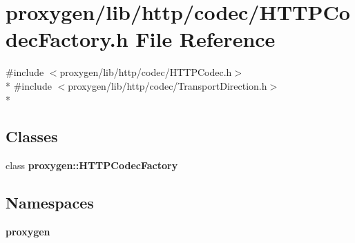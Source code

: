 \section{proxygen/lib/http/codec/\+H\+T\+T\+P\+Codec\+Factory.h File Reference}
\label{HTTPCodecFactory_8h}
{\ttfamily \#include $<$proxygen/lib/http/codec/\+H\+T\+T\+P\+Codec.\+h$>$}\\*
{\ttfamily \#include $<$proxygen/lib/http/codec/\+Transport\+Direction.\+h$>$}\\*
\subsection*{Classes}
\begin{DoxyCompactItemize}
\item 
class {\bf proxygen\+::\+H\+T\+T\+P\+Codec\+Factory}
\end{DoxyCompactItemize}
\subsection*{Namespaces}
\begin{DoxyCompactItemize}
\item 
 {\bf proxygen}
\end{DoxyCompactItemize}
